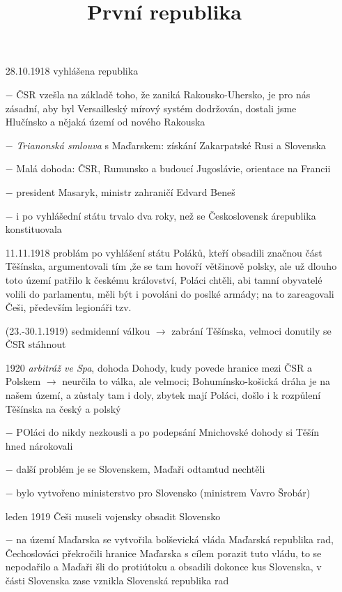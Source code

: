 \documentclass{article}
\title{\vspace{-2cm}\Kapitan První republika\vspace{-1.7cm}}
\date{}
\author{}
\begin{document}
\maketitle
\begin{itemize}
    \vspace{-0.5em}
    \setlength\itemsep{0.15em}
    \item[28.10.1918] vyhlášena republika
    \item[$-$] ČSR vzešla na základě toho, že zaniká Rakousko-Uhersko, je pro nás zásadní, aby byl Versailleský mírový systém dodržován, dostali jsme Hlučínsko a nějaká území od nového Rakouska
    \item[$-$] \textit{Trianonská smlouva} s Maďarskem: získání Zakarpatské Rusi a Slovenska
    \item[$-$] Malá dohoda: ČSR, Rumunsko a budoucí Jugoslávie, orientace na Francii
    \item[$-$] president Masaryk, ministr zahraničí Edvard Beneš
    \item[$-$] i po vyhlášední státu trvalo dva roky, než se Československ árepublika konstituovala
    \item[11.11.1918] problám po vyhlášení státu Poláků, kteří obsadili značnou část Těšínska, argumentovali tím ,že se tam hovoří většinově polsky, ale už dlouho toto území patřilo k českému království, Poláci chtěli, abi tamní obyvatelé volili do parlamentu, měli být i povoláni do poslké armády; na to zareagovali Češi, především legionáři tzv.
    \item[(23.-30.1.1919)] {\Kapitan sedmidenní válkou} $\rightarrow$ zabrání Těšínska, velmoci donutily se ČSR stáhnout
    \item[1920] \textit{arbitráž ve Spa}, dohoda Dohody, kudy povede hranice mezi ČSR a Polskem $\rightarrow$ neurčila to válka, ale velmoci; Bohumínsko-košická dráha je na našem území, a zůstaly tam i doly, zbytek mají Poláci, došlo i k rozpůlení Těšínska na český a polský
    \item[$-$] POláci do nikdy nezkousli a po podepsání Mnichovské dohody si Těšín hned nárokovali
    \item[$-$] další problém je se Slovenskem, Maďaři odtamtud nechtěli
    \item[$-$] bylo vytvořeno ministerstvo pro Slovensko (ministrem Vavro Šrobár)
    \item[leden 1919] Češi museli vojensky obsadit Slovensko
    \item[$-$] na území Maďarska se vytvořila bolševická vláda Maďarská republika rad, Čechoslováci překročili hranice Maďarska s cílem porazit tuto vládu, to se nepodařilo a Maďaři šli do protiútoku a obsadili dokonce kus Slovenska, v části Slovenska zase vznikla Slovenská republika rad

\end{itemize}
\end{document}
